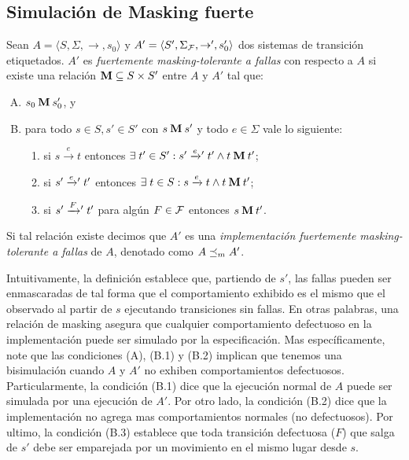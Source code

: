 \subsection{Simulación de Masking fuerte}
\begin{definition} \label{def:masking_rel}
  Sean $A =\langle S, \Sigma, \rightarrow, s_0\rangle$ y $A' =\langle S', \Sigma_{\mathcal{F}}, \rightarrow', s_0' \rangle$ dos sistemas de transición etiquetados.
  $A'$ es \emph{fuertemente masking-tolerante a fallas} con respecto a $A$ si existe una relación 
$\mathbin{\mathbf{M}} \subseteq S \times S'$ entre $A$ y $A'$ tal que:

\begin{enumerate}[(A)]
  \item $s_0 \mathbin{\mathbf{M}} s'_0$, y
  \item para todo $s \in S, s' \in S'$ con $s \mathbin{\mathbf{M}} s'$ y todo $e \in \Sigma$ vale lo siguiente:

  \begin{enumerate}[(1)]
    \item 
    si $s \xrightarrow{e} t$ entonces
    $\exists\; t' \in S': s' \mathrel{{\xrightarrow[]{e}}{}'} t'  \wedge t \mathbin{\mathbf{M}} t'$;

      \item si $s' \mathrel{{\xrightarrow[]{e}}{}'} t'$ entonces
      $\exists \; t \in S: s \xrightarrow{e} t \wedge t \mathbin{\mathbf{M}} t'$;

      \item si $s' \mathrel{{\xrightarrow[]{F}}{}'} t' $ para algún $F \in \mathcal{F}$ entonces
      $s \mathbin{\mathbf{M}} t'$.
      
  \end{enumerate}
\end{enumerate}

Si tal relación existe decimos que $A'$ es una \emph{implementación fuertemente masking-tolerante a fallas} de $A$, denotado como $A \preceq_{m} A'$. 
\end{definition}

 Intuitivamente, la definición establece que, partiendo de $s'$, las fallas pueden ser enmascaradas de tal forma que el comportamiento exhibido es el mismo que el observado al partir de $s$ ejecutando transiciones sin fallas. 
 En otras palabras, una relación de masking asegura que cualquier comportamiento defectuoso en la implementación puede ser simulado por la especificación. Mas específicamente, note que las condiciones (A), (B.1) y (B.2) implican que tenemos una bisimulación cuando $A$ y $A'$ no exhiben comportamientos defectuosos.
Particularmente, la condición (B.1) dice que la ejecución normal de $A$ puede ser simulada por una ejecución de $A'$. Por otro lado, la condición (B.2) dice que la implementación no agrega mas comportamientos normales (no defectuosos). Por ultimo, la condición (B.3) establece que toda transición defectuosa ($F$) que salga de $s'$ debe ser emparejada por un movimiento en el mismo lugar desde $s$.

